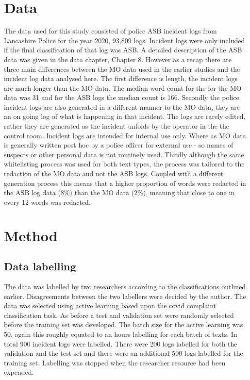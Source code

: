 \section{Data}

The data used for this study consisted of police ASB incident logs from Lancashire Police for the year 2020,  93,809 logs. Incident logs were only included if the final classification of that log was ASB. A detailed description of the ASB data was given in the data chapter, Chapter 8.  However as a recap there are three main differences between the MO data used in the earlier studies and the incident log data analysed here. The first difference is length, the incident logs are much longer than the MO data. The median word count for the for the MO data was 31 and for the ASB logs the median count is 166. Secondly the police incident logs are also generated in a different manner to the MO data, they are an on going log of what is happening in that incident. The logs are rarely edited, rather they are generated as the incident unfolds by the operator in the the control room.  Incident logs are intended for internal use only. Where as MO data is generally written post hoc by a police officer for external use - so names of suspects or other personal data is not routinely used. Thirdly although the same whitelisting process was used for both text types, the process was tailored to the redaction of the MO data and not the ASB logs. Coupled with a different generation process this means that a higher proportion of words were redacted in the ASB log data (8\%) than the MO data (2\%), meaning that close to one in every 12 words was redacted.

\section{Method}


\subsection{Data labelling} The data was labelled by two researchers according to the classifications outlined earlier. Disagreements between the two labellers were decided by the author. The data was selected using active learning based upon the covid complaint classification task. As before a test and validation set were randomly selected before the training set was developed. The batch size for the active learning was 50, again this roughly equated to an  hours labelling for each batch of texts. In total 900 incident logs were labelled. There were 200 logs labelled for both the validation and the test set and there were an additional 500 logs labelled for the training set. Labelling was stopped when the researcher resource had been expended.

